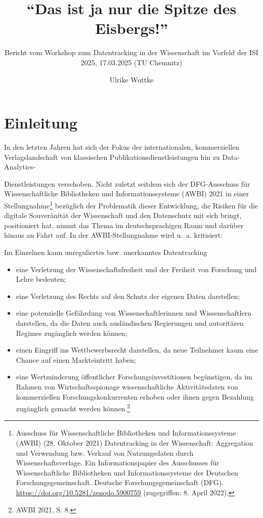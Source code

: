 \documentclass[a4paper,
fontsize=11pt,
oneside,
numbers=noperiodatend,
parskip=half-,
bibliography=totoc,
final
]{scrartcl}
\title{\LARGE{\enquote{Das ist ja nur die Spitze des Eisbergs!}}}%
\subtitle{Bericht vom Workshop zum Datentracking in der Wissenschaft im Vorfeld der ISI 2025, 17.03.2025 (TU Chemnitz)}
\author{Ulrike Wuttke} %
\date{}
\begin{document}
\maketitle
\thispagestyle{fancyplain} 


\section{Einleitung}\label{einleitung}

In den letzten Jahren hat sich der Fokus der internationalen,
kommerziellen Verlagslandschaft von klassischen
Publikationsdienstleistungen hin zu Data-Analytics-

Dienstleistungen verschoben. Nicht zuletzt seitdem sich der
DFG-Ausschuss für Wissenschaftliche Bibliotheken und Informationssysteme
(AWBI) 2021 in einer Stellungnahme\footnote{Ausschuss für
  Wissenschaftliche Bibliotheken und Informationssysteme (AWBI) (28.
  Oktober 2021) Datentracking in der Wissenschaft: Aggregation und
  Verwendung bzw. Verkauf von Nutzungsdaten durch Wissenschaftsverlage.
  Ein Informationspapier des Ausschusses für Wissenschaftliche
  Bibliotheken und Informationssysteme der Deutschen
  Forschungsgemeinschaft. Deutsche Forschungsgemeinschaft (DFG).
  \url{https://doi.org/10.5281/zenodo.5900759} (zugegriffen: 8. April
  2022).} bezüglich der Problematik dieser Entwicklung, die Risiken für
die digitale Souveränität der Wissenschaft und den Datenschutz mit sich
bringt, positioniert hat, nimmt das Thema im deutschsprachigen Raum und
darüber hinaus an Fahrt auf. In der AWBI-Stellungnahme wird u.~a.
kritisiert:

 \glqq Im Einzelnen kann unreguliertes bzw. unerkanntes Datentracking
\begin{itemize}
\item eine Verletzung der Wissenschaftsfreiheit und der Freiheit von Forschung und Lehre bedeuten; 
\item eine Verletzung des Rechts auf den Schutz der eigenen Daten darstellen; 
\item eine potenzielle Gefährdung von Wissenschaftlerinnen und Wissenschaftlern darstellen, da die Daten auch
ausländischen Regierungen und autoritären Regimes zugänglich werden können; 
\item einen Eingriff ins Wettbewerbsrecht darstellen, da neue Teilnehmer kaum eine Chance auf einen Markteintritt haben; 
\item eine Wertminderung öffentlicher Forschungsinvestitionen begünstigen, da im Rahmen von Wirtschaftsspionage wissenschaftliche Aktivitätsdaten von kommerziellen Forschungskonkurrenten erhoben oder ihnen gegen Bezahlung zugänglich gemacht werden können.\grqq \footnote{AWBI 2021, S. 8.}
\end{itemize}
\end{document}
